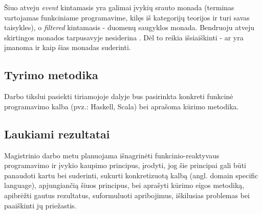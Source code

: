     Šiuo atveju \emph{event} kintamasis yra galimai įvykių srauto monada (terminas vartojamas funkciniame programavime, kilęs iš kategorijų teorijos ir turi savas taisykles), o \emph{filtered} kintamasis - duomenų saugyklos monada. Bendruoju atveju skirtingos monados tarpusavyje nesiderina \cite{DBLP:conf/fp/KingW92}. Dėl to reikia išsiaiškinti - ar yra įmanoma ir kaip šias monadas suderinti.

\subsection{Tyrimo metodika}

    Darbo tikslui pasiekti tiriamojoje dalyje bus pasirinkta konkreti funkcinė programavimo kalba (pvz.: Haskell, Scala) bei aprašoma kūrimo metodika.

\subsection{Laukiami rezultatai}

    Magistrinio darbo metu planuojama išnagrinėti funkcinio-reaktyvaus programavimo ir įvykio kaupimo principus, įrodyti, jog šie principai gali būti panaudoti kartu bei suderinti, sukurti konkretizuotą kalbą (angl. domain specific language), apjungiančią šiuos principus, bei aprašyti kūrimo eigos metodiką, apibrėžti gautus rezultatus, suformuluoti apribojimus, iškilusias problemas bei paaiškinti jų priežastis.
